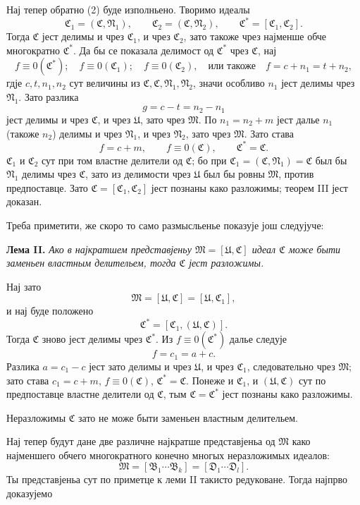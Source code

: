 ﻿\documentclass[11pt]{article}
\newcommand{\ideal}[1]{\mathfrak{#1}}
\begin{document}
Нај тепер обратно (2) буде изполньено. Творимо идеалы
\[
 \ideal C_1=(\ideal C,\ideal N_1),\qquad
 \ideal C_2=(\ideal C,\ideal N_2),\qquad
 \ideal C^*=[\ideal C_1,\ideal C_2].
\]
Тогда \(\ideal C\) јест делимы и чрез \(\ideal C_1\), и чрез \(\ideal C_2\), зато такоже чрез најменше обче многократно \(\ideal C^*\). Да бы се показала делимост од \(\ideal C^*\) чрез \(\ideal C\), нај
\[
 f\equiv0(\ideal C^*);\quad f\equiv0(\ideal C_1);\quad f\equiv0(\ideal C_2),
 \quad\text{или такоже}\quad f=c+n_1=t+n_2,
\]
гдје \(c,t,n_1,n_2\) сут величины из \(\ideal C,\ideal C,\ideal N_1,\ideal N_2\), значи особливо \(n_1\) јест делимы чрез \(\ideal N_1\). Зато разлика
\[
 g=c-t=n_2-n_1
\]
јест делимы и чрез \(\ideal C\), и чрез \(\ideal U\), зато чрез \(\ideal M\). По \(n_1=n_2+m\) јест далье \(n_1\) (такоже \(n_2\)) делимы и чрез \(\ideal N_1\), и чрез \(\ideal N_2\), зато чрез \(\ideal M\). Зато става
\[
 f=c+m,\qquad f\equiv0(\ideal C),\qquad \ideal C^*=\ideal C.
\]
\(\ideal C_1\) и \(\ideal C_2\) сут при том властне делители од \(\ideal C\); бо при \(\ideal C_1=(\ideal C,\ideal N_1)=\ideal C\) был бы \(\ideal N_1\) делимы чрез \(\ideal C\), зато из делимости чрез \(\ideal U\) был бы ровны \(\ideal M\), против предпоставце. Зато \(\ideal C=[\ideal C_1,\ideal C_2]\) јест познаны како разложимы; теорем III јест доказан.

Треба приметити, же скоро то само размысльенье показује још следујуче:

\textbf{Лема II.} \emph{Ако в најкратшем представјеньу \(\ideal M=[\ideal U,\ideal C]\) идеал \(\ideal C\) може быти заменьен властным делительем, тогда \(\ideal C\) јест разложимы.}

Нај зато
\[
 \ideal M=[\ideal U,\ideal C]=[\ideal U,\ideal C_1],
\]
и нај буде положено
\[
 \ideal C^*=[\ideal C_1,(\ideal U,\ideal C)].
\]
Тогда \(\ideal C\) зново јест делимы чрез \(\ideal C^*\). Из \(f\equiv0(\ideal C^*)\) далье следује
\[
 f=c_1=a+c.
\]
Разлика \(a=c_1-c\) јест зато делимы и чрез \(\ideal U\), и чрез \(\ideal C_1\), следовательно чрез \(\ideal M\); зато става \(c_1=c+m\), \(f\equiv0(\ideal C)\), \(\ideal C^*=\ideal C\). Понеже и \(\ideal C_1\), и \((\ideal U,\ideal C)\) сут по предпоставце властне делители од \(\ideal C\), тым \(\ideal C=\ideal C^*\) јест познаны како разложимы.

Неразложимы \(\ideal C\) зато не може быти заменьен властным делительем.

Нај тепер будут дане две различне најкратше представјеньа од \(\ideal M\) како најменшего обчего многократного конечно многых неразложимых идеалов:
\[
 \ideal M=[\ideal B_1\cdots\ideal B_k]=[\ideal D_1\cdots\ideal D_l].
\]
Ты представјеньа сут по приметце к леми II такисто редуковане. Тогда најпрво доказујемо
\end{document}
